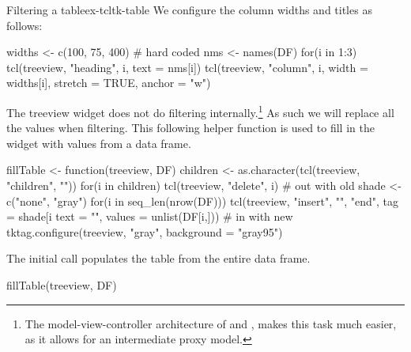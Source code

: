 \begin{example}{Filtering a table}{ex-tcltk-table}
We configure the column widths and titles as follows:
\begin{Schunk}
\begin{Sinput}
 widths <- c(100, 75, 400)            # hard coded
 nms <- names(DF)
 for(i in 1:3) {
   tcl(treeview, "heading", i, text = nms[i])
   tcl(treeview, "column", i, width = widths[i], 
       stretch = TRUE, anchor = "w")
 }
\end{Sinput}
\end{Schunk}
%
The treeview widget does not do filtering internally.\footnote{The
  model-view-controller architecture of \GTK{} and \Qt, makes this task
  much easier, as it allows for an intermediate proxy model.} As such
we will replace all the values when filtering.  This following helper
function is used to fill in the widget with values from a data frame.
\begin{Schunk}
\begin{Sinput}
 fillTable <- function(treeview, DF) {
   children <- as.character(tcl(treeview, "children", ""))
   for(i in children) 
     tcl(treeview, "delete", i)                 # out with old
   shade <- c("none", "gray")
   for(i in seq_len(nrow(DF))) 
     tcl(treeview, "insert", "", "end", tag = shade[i %
         text = "",  
         values = unlist(DF[i,]))               # in with new
   tktag.configure(treeview, "gray", background = "gray95")
 }
\end{Sinput}
\end{Schunk}
%
The initial call populates the table from the entire data frame.
\begin{Schunk}
\begin{Sinput}
 fillTable(treeview, DF)
\end{Sinput}
\end{Schunk}


\end{example}
